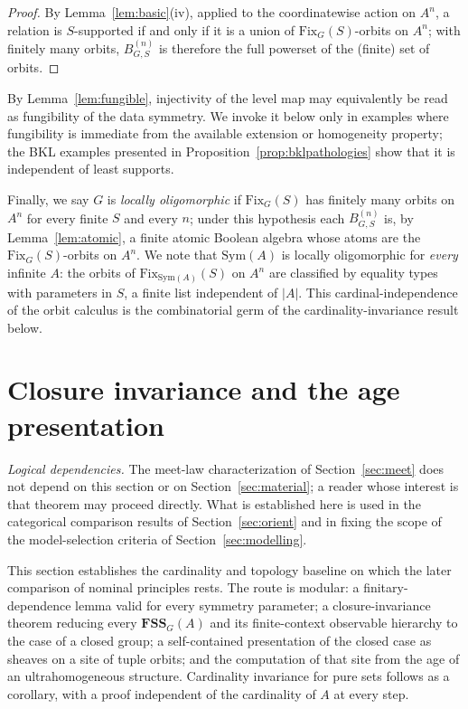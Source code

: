 \documentclass{lmcs}
\newcommand{\Sym}{\mathrm{Sym}}
\newcommand{\Fix}{\mathrm{Fix}}
\newcommand{\FSS}{\mathbf{FSS}}
\begin{document}
\begin{proof}
By Lemma~\ref{lem:basic}(iv), applied to the coordinatewise action on
$A^n$, a relation is $S$-supported if and only if it is a union of
$\Fix_G(S)$-orbits on $A^n$; with finitely many orbits,
$B^{(n)}_{G,S}$ is therefore the full powerset of the (finite) set of
orbits.
\end{proof}

By Lemma~\ref{lem:fungible}, injectivity of the level map may equivalently be read as fungibility of the data symmetry. We invoke it below only in examples where fungibility is immediate from the available extension or homogeneity property; the BKL examples presented in Proposition~\ref{prop:bklpathologies} show that it is independent of least supports.

Finally, we say $G$ is \emph{locally oligomorphic} if $\Fix_G(S)$ has
finitely many orbits on $A^n$ for every finite $S$ and every $n$; under this hypothesis each $B^{(n)}_{G,S}$ is, by Lemma~\ref{lem:atomic}, a finite atomic Boolean algebra whose atoms are the $\Fix_G(S)$-orbits on $A^n$. We note that $\Sym(A)$ is locally oligomorphic for \emph{every} infinite $A$: the orbits of
$\Fix_{\Sym(A)}(S)$ on $A^n$ are classified by equality types with
parameters in $S$, a finite list independent of $|A|$. This
cardinal-independence of the orbit calculus is the combinatorial germ
of the cardinality-invariance result below.

\section{Closure invariance and the age presentation}
\label{sec:regime}

\emph{Logical dependencies.} The meet-law characterization of
Section~\ref{sec:meet} does not depend on this section or on
Section~\ref{sec:material}; a reader whose interest is that theorem may
proceed directly. What is established here is used in the categorical
comparison results of Section~\ref{sec:orient} and in fixing the scope of
the model-selection criteria of Section~\ref{sec:modelling}.

This section establishes the cardinality and topology baseline on which
the later comparison of nominal principles rests. The route is
modular: a finitary-dependence lemma valid for every symmetry
parameter; a closure-invariance theorem reducing every $\FSS_G(A)$ and its finite-context observable hierarchy to
the case of a closed group; a self-contained presentation of the
closed case as sheaves on a site of tuple orbits; and the computation
of that site from the age of an ultrahomogeneous structure. Cardinality
invariance for pure sets follows as a corollary, with a proof independent of
the cardinality of $A$ at every step.
\end{document}
